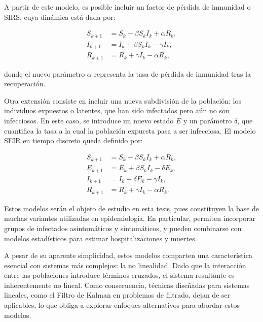A partir de este modelo, es posible incluir un factor de pérdida de inmunidad o SIRS, cuya dinámica está dada por:

\begin{equation}
    \begin{aligned}
    S_{k+1} &= S_k -\beta S_k I_k + \alpha R_k, \\
    I_{k+1} &= I_k + \beta S_k I_k - \gamma I_k, \\
    R_{k+1} &= R_k + \gamma I_k - \alpha R_k,
    \end{aligned}
    \label{eq:SIRS}
\end{equation}

donde el nuevo parámetro \(\alpha\) representa la tasa de pérdida de inmunidad tras la recuperación.

Otra extensión consiste en incluir una nueva subdivisión de la población: los individuos expuestos o latentes, que han sido infectados pero aún no son infecciosos. En este caso, se introduce un nuevo estado \(E\) y un parámetro \(\delta\), que cuantifica la tasa a la cual la población expuesta pasa a ser infecciosa. El modelo SEIR en tiempo discreto queda definido por:

\begin{equation}
    \begin{aligned}
        S_{k+1} &= S_k - \beta S_k I_k + \alpha R_k,  \\
        E_{k+1} &= E_k + \beta S_k I_k - \delta E_k,  \\
        I_{k+1} &= I_k + \delta E_k - \gamma I_k, \\
        R_{k+1} &= R_k + \gamma I_k - \alpha R_k.
    \end{aligned}
    \label{eq:SEIR}
\end{equation}

Estos modelos serán el objeto de estudio en esta tesis, pues constituyen la base de muchas variantes utilizadas en epidemiología. En particular, permiten incorporar grupos de infectados asintomáticos y sintomáticos, y pueden combinarse con modelos estadísticos para estimar hospitalizaciones y muertes.

A pesar de su aparente simplicidad, estos modelos comparten una característica esencial con sistemas más complejos: la no linealidad. Dado que la interacción entre las poblaciones introduce términos cruzados, el sistema resultante es inherentemente no lineal. Como consecuencia, técnicas diseñadas para sistemas lineales, como el Filtro de Kalman en problemas de filtrado, dejan de ser aplicables, lo que obliga a explorar enfoques alternativos para abordar estos modelos.